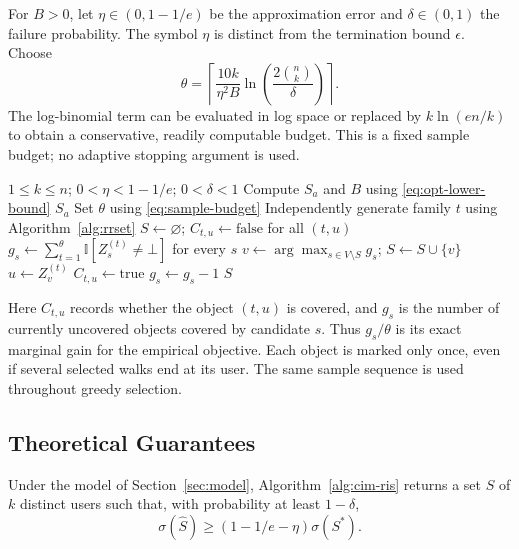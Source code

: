 \documentclass[sigconf]{acmart}
\newcommand{\CIMRIS}{\textsc{CIM-RIS}}
\newcommand{\I}{\mathbb{I}}
\begin{document}
For $B>0$, let $\eta\in(0,1-1/e)$ be the approximation error and
$\delta\in(0,1)$ the failure probability. The symbol $\eta$ is distinct
from the termination bound $\epsilon$. Choose
\begin{equation}
\label{eq:sample-budget}
  \theta=\left\lceil
    \frac{10k}{\eta^2 B}
    \ln\!\left(\frac{2\binom{n}{k}}{\delta}\right)
  \right\rceil.
\end{equation}
The log-binomial term can be evaluated in log space or replaced by
$k\ln(en/k)$ to obtain a conservative, readily computable budget.
This is a fixed sample budget; no adaptive stopping argument is used.

\begin{algorithm}[t]
\caption{\CIMRIS{}$(G,k,\eta,\delta)$ with Explicit Walk Sampling}
\label{alg:cim-ris}
\begin{algorithmic}[1]
\Require $1\leq k\leq n$; $0<\eta<1-1/e$; $0<\delta<1$
\State Compute $S_a$ and $B$ using \eqref{eq:opt-lower-bound}
  \State \Return $S_a$
\EndIf
\State Set $\theta$ using \eqref{eq:sample-budget}
  \State Independently generate family $t$ using Algorithm~\ref{alg:rrset}
\EndFor
\State $S\gets\varnothing$; $C_{t,u}\gets\mathrm{false}$ for all $(t,u)$
\State $g_s\gets\sum_{t=1}^{\theta}\I[Z_s^{(t)}\ne\bot]$ for every $s$
  \State $v\gets\arg\max_{s\in V\setminus S}g_s$; $S\gets S\cup\{v\}$
    \State $u\gets Z_v^{(t)}$
        \State $C_{t,u}\gets\mathrm{true}$
          \State $g_s\gets g_s-1$
        \EndFor
      \EndIf
    \EndIf
  \EndFor
\EndFor
\State \Return $S$
\end{algorithmic}
\end{algorithm}

Here $C_{t,u}$ records whether the object $(t,u)$ is covered, and $g_s$
is the number of currently uncovered objects covered by candidate $s$.
Thus $g_s/\theta$ is its exact marginal gain for the empirical objective.
Each object is marked only once, even if several selected walks end at
its user. The same sample sequence is used throughout greedy selection.

\subsection{Theoretical Guarantees}

\begin{theorem}
\label{thm:approx}
Under the model of Section~\ref{sec:model},
Algorithm~\ref{alg:cim-ris} returns a set $\hat S$ of $k$ distinct
users such that, with probability at least $1-\delta$,
\[
  \sigma(\hat S)\geq(1-1/e-\eta)\sigma(S^*).
\]
\end{theorem}
\end{document}
